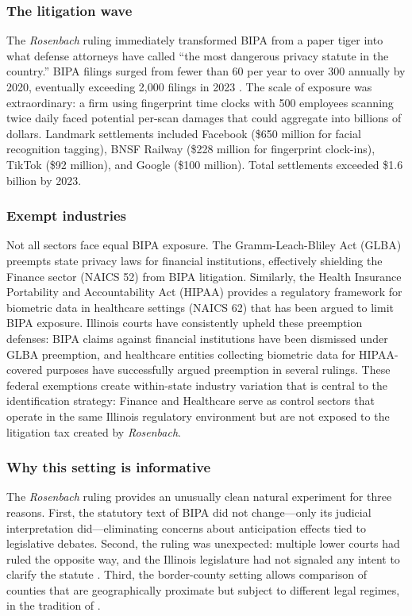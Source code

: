 \documentclass[12pt]{article}
\begin{document}
\subsubsection*{The litigation wave} The \emph{Rosenbach} ruling immediately transformed BIPA from a paper tiger into what defense attorneys have called ``the most dangerous privacy statute in the country.'' BIPA filings surged from fewer than 60 per year to over 300 annually by 2020, eventually exceeding 2,000 filings in 2023 \citep{greenwald2022}. The scale of exposure was extraordinary: a firm using fingerprint time clocks with 500 employees scanning twice daily faced potential per-scan damages that could aggregate into billions of dollars. Landmark settlements included Facebook (\$650 million for facial recognition tagging), BNSF Railway (\$228 million for fingerprint clock-ins), TikTok (\$92 million), and Google (\$100 million). Total settlements exceeded \$1.6 billion by 2023.

\subsubsection*{Exempt industries} Not all sectors face equal BIPA exposure. The Gramm-Leach-Bliley Act (GLBA) preempts state privacy laws for financial institutions, effectively shielding the Finance sector (NAICS 52) from BIPA litigation. Similarly, the Health Insurance Portability and Accountability Act (HIPAA) provides a regulatory framework for biometric data in healthcare settings (NAICS 62) that has been argued to limit BIPA exposure. Illinois courts have consistently upheld these preemption defenses: BIPA claims against financial institutions have been dismissed under GLBA preemption, and healthcare entities collecting biometric data for HIPAA-covered purposes have successfully argued preemption in several rulings. These federal exemptions create within-state industry variation that is central to the identification strategy: Finance and Healthcare serve as control sectors that operate in the same Illinois regulatory environment but are not exposed to the litigation tax created by \emph{Rosenbach}.

\subsubsection*{Why this setting is informative} The \emph{Rosenbach} ruling provides an unusually clean natural experiment for three reasons. First, the statutory text of BIPA did not change---only its judicial interpretation did---eliminating concerns about anticipation effects tied to legislative debates. Second, the ruling was unexpected: multiple lower courts had ruled the opposite way, and the Illinois legislature had not signaled any intent to clarify the statute \citep{goldsmith2023}. Third, the border-county setting allows comparison of counties that are geographically proximate but subject to different legal regimes, in the tradition of \citet{dube2010}.
\end{document}

